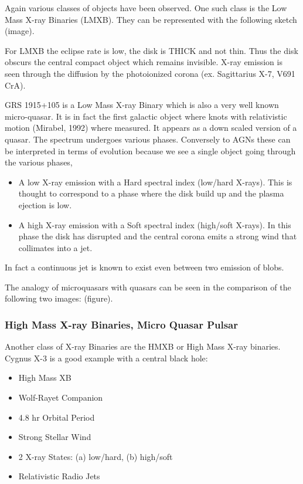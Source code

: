 \documentclass[10pt,a4paper,english]{article}
\begin{document}
Again various classes of objects have been observed. One such class is the Low Mass X-ray Binaries (LMXB). They can be represented with the following sketch (image).

For LMXB the eclipse rate is low, the disk is THICK and not thin. Thus the disk obscurs the central compact object which remains invisible. X-ray emission is seen through the diffusion by the photoionized corona (ex. Sagittarius X-7, V691 CrA).

GRS 1915+105 is a Low Mass X-ray Binary which is also a very well known micro-quasar. It is in fact the first galactic object where knots with relativistic motion (Mirabel, 1992) where measured. It appears as a down scaled version of a quasar. The spectrum undergoes various phases. Conversely to AGNs these can be interpreted in terms of evolution because we see a single object going through the various phases,

\begin{itemize}
    \item A low X-ray emission with a Hard spectral index (low/hard X-rays). This is thought to correspond to a phase where the disk build up and the plasma ejection is low.
    \item A high X-ray emission with a Soft spectral index (high/soft X-rays). In this phase the disk has disrupted and the central corona emits a strong wind that collimates into a jet.
\end{itemize}

In fact a continuous jet is known to exist even between two emission of blobs.

The analogy of microquasars with quasars can be seen in the comparison of the following two images: (figure).

\subsubsection{High Mass X-ray Binaries, Micro Quasar Pulsar}
Another class of X-ray Binaries are the HMXB or High Mass X-ray binaries. Cygnus X-3 is a good example with a central black hole:
\begin{itemize}
    \item High Mass XB
    \item Wolf-Rayet Companion
    \item 4.8 hr Orbital Period
    \item Strong Stellar Wind
    \item 2 X-ray States: (a) low/hard, (b) high/soft
    \item Relativistic Radio Jets
\end{itemize}
\end{document}
